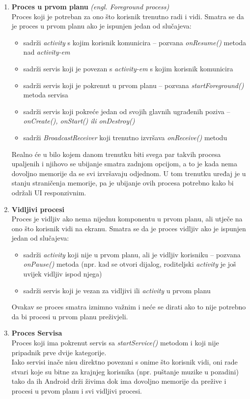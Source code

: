 \documentclass[times, utf8, zavrsni]{fer}
\begin{document}
\begin{enumerate}
\item
\textbf{Proces u prvom planu} \textit{(engl. Foreground process)}\\
Proces koji je potreban za ono što korisnik trenutno radi i vidi. Smatra se da je proces u prvom planu ako je ispunjen jedan od slučajeva:
	\begin{itemize}
	\item sadrži \textit{activity} s kojim korisnik komunicira – pozvana \textit{onResume()} metoda nad \textit{activity-em}
	\item sadrži servis koji je povezan s \textit{activity-em} s kojim korisnik komunicira
	\item sadrži servis koji je pokrenut u prvom planu – pozvana \textit{startForeground()} metoda servisa
	\item sadrži servis koji pokreće jedan od svojih glavnih ugrađenih poziva – \textit{onCreate(), onStart() ili onDestroy()}
	\item sadrži \textit{BroadcastReceiver} koji trenutno izvršava \textit{onReceive()} metodu
	\end{itemize}
Realno će  u bilo kojem danom trenutku biti svega par takvih procesa upaljenih i njihovo se ubijanje smatra zadnjom opcijom, a to je kada nema dovoljno memorije da se svi izvršavaju odjednom. U tom trenutku uređaj je u stanju straničenja memorije, pa je ubijanje ovih procesa potrebno kako bi održali UI responzivnim.	
	
\item
\textbf{Vidljivi procesi}\\
Proces je vidljiv ako nema nijednu komponentu u prvom planu, ali utječe na ono što korisnik vidi na ekranu. Smatra se da je proces vidljiv ako je ispunjen jedan od slučajeva:
	\begin{itemize}
	\item sadrži \textit{activity} koji nije u prvom planu, ali je vidljiv korisniku – pozvana \textit{onPause()} metoda (npr. kad se otvori dijalog, roditeljski \textit{activity} je još uvijek vidljiv ispod njega)
	\item sadrži servis koji je vezan za vidljivi ili \textit{activity} u prvom planu
	\end{itemize}
Ovakav se proces smatra iznimno važnim i neće se dirati ako to nije potrebno da bi procesi u prvom planu preživjeli.

\item
\textbf{Proces Servisa}\\
Proces koji ima pokrenut servis sa \textit{startService()} metodom i koji nije pripadnik prve dvije kategorije.\\
Iako servisi inače nisu direktno povezani s onime što korisnik vidi, oni rade stvari koje su bitne za krajnjeg korisnika (npr. puštanje muzike u pozadini) tako da ih Android drži živima dok ima dovoljno memorije da prežive i procesi u prvom planu i svi vidljivi procesi.


\end{enumerate}
\end{document}
